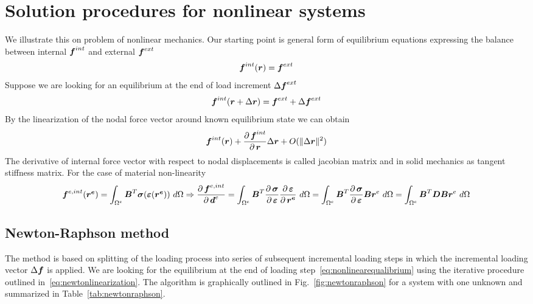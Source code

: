 \section{Solution procedures for nonlinear systems}
We illustrate this on problem of nonlinear mechanics. Our starting point is general form of equilibrium equations expressing the balance between internal $\mbox{\boldmath$f$}^{int}$ and external $\mbox{\boldmath$f$}^{ext}$
$$
\mbox{\boldmath$f$}^{int}(\mbox{\boldmath$r$}) = \mbox{\boldmath$f$}^{ext}
$$
Suppose we are looking for an equilibrium at the end of load increment $\Delta\mbox{\boldmath$f$}^{ext}$
\begin{equation}
  \mbox{\boldmath$f$}^{int}(\mbox{\boldmath$r$}+\Delta\mbox{\boldmath$r$}) = \mbox{\boldmath$f$}^{ext}+\Delta\mbox{\boldmath$f$}^{ext}
  \label{eq:nonlinearequalibrium}
\end{equation}
By the linearization of the nodal force vector around known equilibrium state we can obtain
\begin{equation}
  \mbox{\boldmath$f$}^{int}(\mbox{\boldmath$r$})+\mbox{$\displaystyle\frac{\partial \,{\mbox{\boldmath$f$}^{int}}}{\partial \,{\mbox{\boldmath$r$}}}$}\Delta\mbox{\boldmath$r$}+O(\|\Delta\mbox{\boldmath$r$}\|^2)
\end{equation}
The derivative of internal force vector with respect to nodal displacements is called jacobian matrix and in solid mechanics as tangent stiffness matrix.
For the case of material non-linearity
$$
\mbf{f}^{e,int}(\mbf{r^e})=\int_{\Omega^e}\mbf{B}^T\mbf{\sigma}(\mbf{\eps}(\mbf{r^e}))\ d\Omega \Rightarrow
\pard{\mbf{f}^{e,int}}{\mbf{d}^e} = \int_{\Omega^e}\mbf{B}^T\pard{\mbf{\sigma}}{\mbf{\eps}}\pard{\mbf{\eps}}{\mbf{r^e}}\ d\Omega =
\int_{\Omega^e}\mbf{B}^T\pard{\mbf{\sigma}}{\mbf{\eps}}\mbf{B}{\mbf{r}^e}\ d\Omega =
\int_{\Omega^e}\mbf{B}^T\mbf{D}\mbf{B}{\mbf{r}^e}\ d\Omega
\label{eq:newtonlinearization}
$$

\subsection{Newton-Raphson method}
The method is based on splitting of the loading process into series of subsequent incremental loading steps in which the incremental loading vector $\Delta\mbox{\boldmath$f$}$ is applied. We are looking for the equilibrium at the end of loading step~\ref{eq:nonlinearequalibrium} using the iterative procedure outlined in~\ref{eq:newtonlinearization}. The algorithm is graphically outlined in Fig.~\ref{fig:newtonraphson} for a system with one unknown and summarized in Table~\ref{tab:newtonraphson}.

